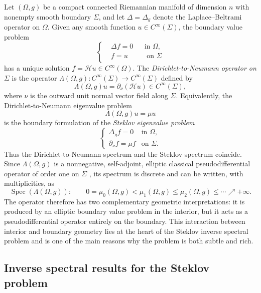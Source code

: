 \documentclass[11pt]{amsart}
\newcommand{\Spec}{\operatorname{Spec}}
\theoremstyle{definition}
\numberwithin{equation}{section}
\begin{document}
	Let $(\Omega,g)$ be a compact connected Riemannian manifold of dimension $n$ with nonempty smooth boundary $\Sigma$, and let $\Delta=\Delta_g$ denote the Laplace--Beltrami operator on $\Omega$. Given any smooth function $u\in C^\infty(\Sigma)$, the boundary value problem
	\[\left\{\begin{aligned}
		& \Delta f = 0 && \text{in $\Omega$},\\
		& f = u && \text{ on $\Sigma$}\\
	\end{aligned}\right.\]
	has a unique solution $f=\mathcal Hu\in C^\infty(\Omega)$. The {\em Dirichlet-to-Neumann operator on $\Sigma$} is the operator  $\Lambda(\Omega,g): C^\infty(\Sigma)\to C^\infty(\Sigma)$ defined by  
	\[\Lambda(\Omega,g) u =  {\partial_\nu(\mathcal Hu)} \in C^\infty(\Sigma),\]
	where $\nu$ is the  outward unit normal vector field along $\Sigma$.  Equivalently, the Dirichlet-to-Neumann eigenvalue problem 
	\[
	\Lambda(\Omega,g)u=\mu u
	\]
	is the boundary formulation of the {\em Steklov eigenvalue problem}
	\[
	\begin{cases}
		\Delta_g f=0 & \text{in }\Omega,\\
		\partial_\nu f=\mu f & \text{on }\Sigma.
	\end{cases}
	\]
	Thus the Dirichlet-to-Neumann spectrum and the Steklov spectrum coincide.  Since $\Lambda(\Omega,g)$ is a nonnegative, self-adjoint, elliptic classical pseudodifferential operator of order one on $\Sigma$ \cite{taylorPartialDifferentialEquations2011}, its spectrum is discrete and can be written, with multiplicities, as
	\[
	\Spec(\Lambda(\Omega,g)):
	\qquad
	0=\mu_0(\Omega,g)<\mu_1(\Omega,g)\leq \mu_2(\Omega,g)\leq\cdots\nearrow+\infty.
	\]
	The operator therefore has two complementary geometric interpretations: it is produced by an elliptic boundary value problem in the interior, but it acts as a pseudodifferential operator entirely on the boundary.  This interaction between interior and boundary geometry lies at the heart of the Steklov inverse spectral problem and is one of the main reasons why the problem is both subtle and rich.
	
	\subsection{Inverse spectral results for the Steklov problem}
	
\end{document}
